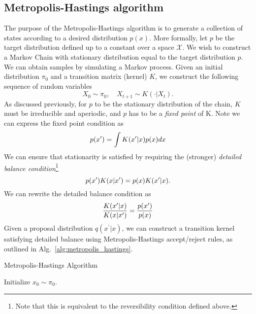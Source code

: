 \documentclass[../main.tex]{subfiles}
\begin{document}
\subsection{Metropolis-Hastings algorithm}
The purpose of the Metropolis-Hastings algorithm is to generate a collection of
states according to a desired distribution $p(x)$.
%
More formally, let $p$ be the target distribution defined up to a constant over
a space $\mathcal{X}$.
%
We wish to construct a Markov Chain with stationary distribution equal to the
target distribution $p$.
%
We can obtain samples by simulating a Markov process.
%
Given an initial distribution $\pi_0$ and a transition matrix (kernel) $K$, we
construct the following sequence of random variables
%
\begin{equation}
  X_0 \sim \pi_0, \quad X_{t+1} \sim K(\cdot|X_t).
\end{equation}
%
As discussed previously, for $p$ to be the stationary distribution of the
chain, $K$ must be irreducible and aperiodic, and $p$ has to be a \emph{fixed
point} of K. Note we can express the fixed point condition as 
%
\begin{equation}
  p({x^{\prime}}) = \int K({x^{\prime}} | x) p(x) dx
\end{equation}
%
We can ensure that stationarity is satisfied by requiring the (stronger)
\emph{detailed balance condition}\footnote{Note that this is equivalent to the
reversibility condition defined above.}
%
\begin{equation}
  p{({x^{\prime}})} K{(x|{x^{\prime}})} = p{(x)} K{({x^{\prime}}|x)}.
\end{equation}
%
%
We can rewrite the detailed balance condition as 
%
\begin{equation}
  \frac{K{({x^{\prime}} | x)}}{K(x | {x^{\prime}})} = \frac{p({x^{\prime}})}{p(x)}
\end{equation}
%
Given a proposal distribution $q{(x^{\prime}|x)}$, we can construct a transition kernel satisfying detailed balance
using Metropolis-Hastings accept/reject rules, as outlined in Alg.~\ref{alg:metropolis_hastings}.
%
\begin{algorithm}[htpb]%
  \AlgoDontDisplayBlockMarkers\SetAlgoNoEnd\SetAlgoNoLine%
  \DontPrintSemicolon%
  \caption{Metropolis-Hastings Algorithm}%
  \;
  Initialize $x_0 \sim \pi_0$.\;
\label{alg:metropolis_hastings}
\end{algorithm}
\end{document}
